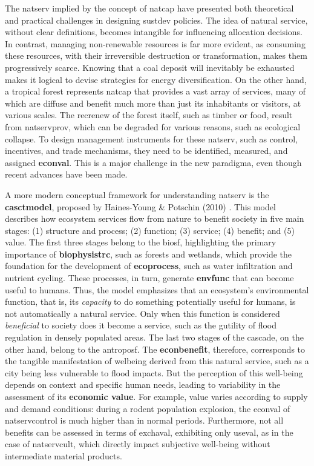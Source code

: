 \documentclass[./main_en.tex]{subfiles}
\begin{document}
\par The \gls{natserv} implied by the concept of \gls{natcap} have presented both theoretical and practical challenges in designing \gls{sustdev} policies. The idea of natural service, without clear definitions, becomes intangible for influencing allocation decisions. In contrast, managing non-renewable resources is far more evident, as consuming these resources, with their irreversible destruction or transformation, makes them progressively scarce. Knowing that a coal deposit will inevitably be exhausted makes it logical to devise strategies for energy diversification. On the other hand, a tropical forest represents \gls{natcap} that provides a vast array of services, many of which are diffuse and benefit much more than just its inhabitants or visitors, at various scales. The \gls{recrenew} of the forest itself, such as timber or food, result from \gls{natservprov}, which can be degraded for various reasons, such as ecological collapse. To design management instruments for these \gls{natserv}, such as control, incentives, and trade mechanisms, they need to be identified, measured, and assigned \textbf{\gls{econval}}. This is a major challenge in the new \gls{paradigma}, even though recent advances have been made.

\par A more modern conceptual framework for understanding \gls{natserv} is the \textbf{\gls{casctmodel}}, proposed by Haines-Young \& Potschin (2010) \cite{haines-young2010, potschin2016}. This \gls{model} describes how ecosystem services flow from nature to benefit society in five main stages: (1) structure and process; (2) function; (3) service; (4) benefit; and (5) value. The first three stages belong to the \gls{biosf}, highlighting the primary importance of \textbf{\gls{biophysistrc}}, such as forests and wetlands, which provide the foundation for the development of \textbf{\gls{ecoprocess}}, such as water infiltration and nutrient cycling. These processes, in turn, generate \textbf{\gls{envfunc}} that can become useful to humans. Thus, the \gls{model} emphasizes that an ecosystem's environmental function, that is, its \textit{capacity} to do something potentially useful for humans, is not automatically a natural service. Only when this function is considered \textit{beneficial} to society does it become a service, such as the \gls{gutility} of flood regulation in densely populated areas. The last two stages of the cascade, on the other hand, belong to the \gls{antroposf}. The \textbf{\gls{econbenefit}}, therefore, corresponds to the tangible manifestation of \gls{welbeing} derived from this natural service, such as a city being less vulnerable to flood impacts. But the perception of this well-being depends on context and specific human needs, leading to variability in the assessment of its \textbf{economic value}. For example, value varies according to supply and demand conditions: during a rodent population explosion, the \gls{econval} of \gls{natservcontrol} is much higher than in normal periods. Furthermore, not all benefits can be assessed in terms of \gls{exchaval}, exhibiting only \gls{useval}, as in the case of \gls{natservcult}, which directly impact subjective well-being without intermediate material products.
\end{document}
